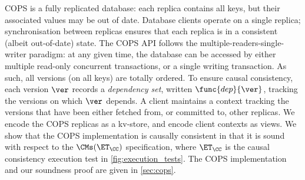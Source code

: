 COPS is a fully replicated database: each replica contains all keys, but their associated values may be out of date.
Database clients operate on a single replica; 
synchronisation between replicas ensures that each replica is in a consistent (albeit out-of-date) state.
The COPS API follows the multiple-readers-single-writer paradigm: 
at any given time, the database can be accessed by either multiple read-only concurrent transactions, or a single writing transaction. 
As such, all versions (on all keys) are totally ordered. 
To ensure causal consistency, each version $\ver$ records a \emph{dependency set}, written $\func{dep}{\ver}$,
tracking the versions on which $\ver$ depends.
A client maintains a context tracking the versions that have been either fetched from, or committed to, other replicas.
%
%
%
%
We encode the COPS replicas as a kv-store, and encode client contexts as views.  
We show that the COPS implementation is causally consistent in that it is sound with respect to the $\CMs(\ET_\CC)$
specification, where $\ET_\CC$ is the causal consistency execution test in \cref{fig:execution_tests}.
The COPS implementation and our soundness proof are given in \cref{sec:cops}.

